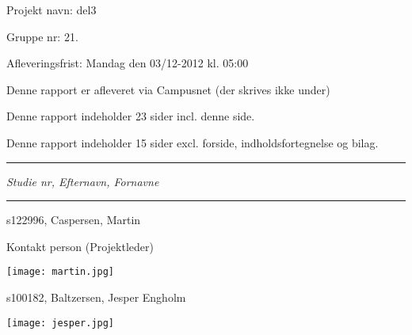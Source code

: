 
{\normalsize

\noindent Projekt navn: del3

\noindent Gruppe nr: 21.

\noindent Afleveringsfrist: Mandag den 03/12-2012 kl. 05:00

\noindent Denne rapport er afleveret via Campusnet (der skrives ikke under)

\noindent Denne rapport indeholder 23 sider incl. denne side.

\noindent Denne rapport indeholder 15 sider excl. forside, indholdsfortegnelse og bilag.
}
\fancybreak{}
\noindent \emph{Studie nr, Efternavn, Fornavne}
\fancybreak{}

\noindent s122996, Caspersen, Martin

\noindent Kontakt person (Projektleder)

\noindent \texttt{[image: martin.jpg]}

\noindent s100182, Baltzersen, Jesper Engholm

\noindent \texttt{[image: jesper.jpg]}